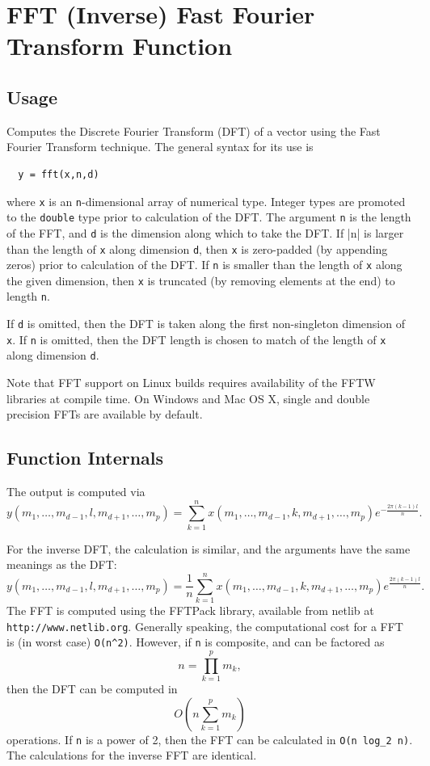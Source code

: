 \section{FFT (Inverse) Fast Fourier Transform Function}

\subsection{Usage}

Computes the Discrete Fourier Transform (DFT) of a vector using the
Fast Fourier Transform technique.  The general syntax for its use is
\begin{verbatim}
  y = fft(x,n,d)
\end{verbatim}
where \verb|x| is an \verb|n|-dimensional array of numerical type.
Integer types are promoted to the \verb|double| type prior to 
calculation of the DFT. The argument \verb|n| is the length of the
FFT, and \verb|d| is the dimension along which to take the DFT.  If
|n| is larger than the length of \verb|x| along dimension \verb|d|,
then \verb|x| is zero-padded (by appending zeros) prior to calculation
of the DFT.  If \verb|n| is smaller than the length of \verb|x|  along
the given dimension, then \verb|x| is truncated (by removing elements
at the end) to length \verb|n|.  

If \verb|d| is omitted, then the DFT is taken along the first 
non-singleton dimension of \verb|x|.  If \verb|n| is omitted, then
the DFT length is chosen to match of the length of \verb|x| along
dimension \verb|d|.  

Note that FFT support on Linux builds requires availability
of the FFTW libraries at compile time.  On Windows and Mac OS
X, single and double precision FFTs are available by default.
\subsection{Function Internals}

The output is computed via
\[
y(m_1,\ldots,m_{d-1},l,m_{d+1},\ldots,m_{p}) = 
\sum_{k=1}^{n} x(m_1,\ldots,m_{d-1},k,m_{d+1},\ldots,m_{p})
e^{-\frac{2\pi(k-1)l}{n}}.
\]

For the inverse DFT, the calculation is similar, and the arguments
have the same meanings as the DFT:
\[
y(m_1,\ldots,m_{d-1},l,m_{d+1},\ldots,m_{p}) = 
\frac{1}{n} \sum_{k=1}^{n} x(m_1,\ldots,m_{d-1},k,m_{d+1},\ldots,m_{p})
e^{\frac{2\pi(k-1)l}{n}}.
\]
The FFT is computed using the FFTPack library, available from 
netlib at \verb|http://www.netlib.org|.  Generally speaking, the 
computational cost for a FFT is (in worst case) \verb|O(n^2)|.
However, if \verb|n| is composite, and can be factored as
\[
n = \prod_{k=1}^{p} m_k,
\]
then the DFT can be computed in 
\[
O(n \sum_{k=1}^{p} m_k)
\]
operations.  If \verb|n| is a power of 2, then the FFT can be
calculated in \verb|O(n log_2 n)|.  The calculations for the
inverse FFT are identical.
